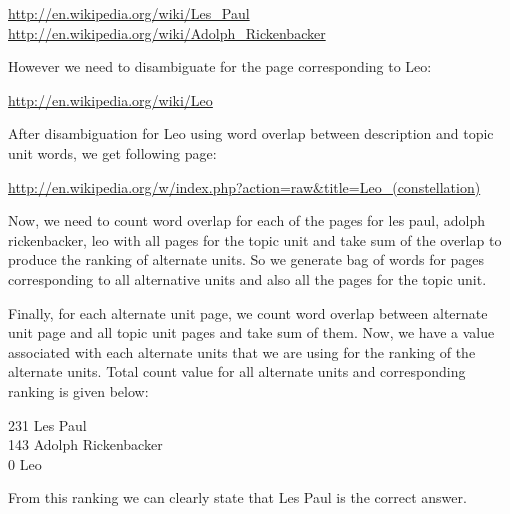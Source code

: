 \documentclass[12pt]{article}
\begin{document}
\url{http://en.wikipedia.org/wiki/Les_Paul}\\
\url{http://en.wikipedia.org/wiki/Adolph_Rickenbacker}

However we need to disambiguate for the page corresponding to Leo:

\url{http://en.wikipedia.org/wiki/Leo}

After disambiguation for Leo using word overlap between description and topic unit words, we get following page:

\url{http://en.wikipedia.org/w/index.php?action=raw&title=Leo_(constellation)}

Now, we need to count word overlap for each of the pages for les paul, adolph rickenbacker, leo with all pages for the topic unit and take sum of the overlap to produce the ranking of alternate units. So we generate bag of words for pages corresponding to all alternative units and also all the pages for the topic unit. 

Finally, for each alternate unit page, we count word overlap between alternate unit page and all topic unit pages and take sum of them. Now, we have a value associated with each alternate units that we are using for the ranking of the alternate units. Total count value for all alternate units and corresponding ranking is given below:

231 Les Paul \\
143 Adolph Rickenbacker \\
0 Leo

From this ranking we can clearly state that Les Paul is the correct answer. 
\end{document}
